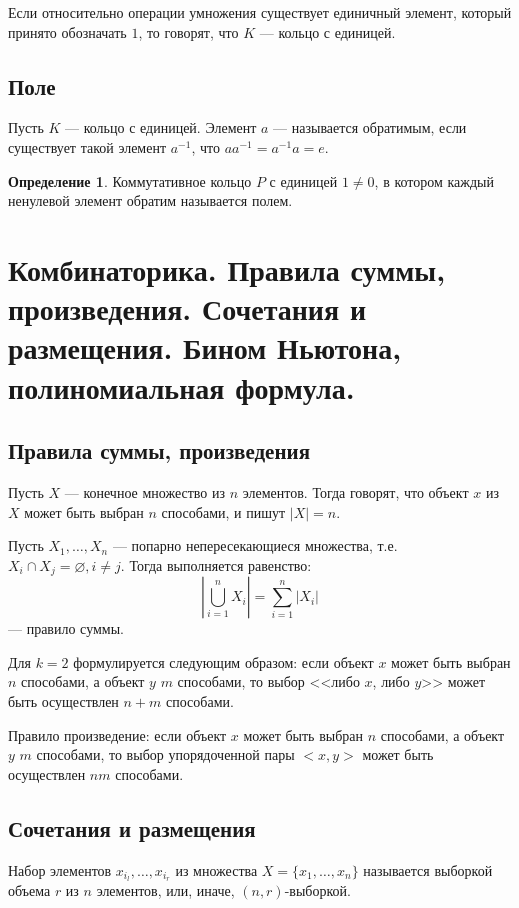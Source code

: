 \documentclass[12pt]{report}
\theoremstyle{definition}
\newtheorem{definition}[theorem]{Определение}
\begin{document}
Если относительно операции умножения существует единичный элемент,
который принято обозначать $1$, то говорят, что $K$ --- кольцо с единицей.

\subsection{Поле}
Пусть $K$ --- кольцо с единицей. Элемент $a$ --- называется обратимым, если
существует такой элемент $a^{-1}$, что $a a^{-1} = a^{-1} a = e$.

\begin{definition}
Коммутативное кольцо $P$ с единицей $1 \ne 0$, в котором каждый ненулевой
элемент обратим называется полем.
\end{definition}


\section
{
  Комбинаторика. Правила суммы, произведения. Сочетания и размещения.
  Бином Ньютона, полиномиальная формула.  
}

\subsection{Правила суммы, произведения}
Пусть $X$ --- конечное множество из $n$ элементов. Тогда говорят, что
объект $x$ из $X$ может быть выбран $n$ способами, и пишут $|X| = n$. 

Пусть $X_1, \dots, X_n$ --- попарно непересекающиеся множества, т.е.
$X_i \cap X_j = \varnothing, i \ne j$. Тогда выполняется равенство:
$$
|\bigcup_{i = 1}^n X_i| = \sum\limits_{i=1}^n |X_i|
$$ --- правило суммы.

Для $k=2$ формулируется следующим образом: если объект
$x$ может быть выбран $n$ способами, а объект $y$ $m$
способами, то выбор <<либо $x$, либо $y$>> может быть осуществлен
$n + m$ способами.

Правило произведение: если объект $x$ может быть выбран
$n$ способами, а объект $y$ $m$ способами, то выбор упорядоченной
пары $<x, y>$ может быть осуществлен $nm$ способами.

\subsection{Сочетания и размещения}
Набор элементов $x_{i_l}, \dots, x_{i_r}$ из множества
$X = \{x_1, \dots, x_n\}$ называется выборкой объема $r$ из
$n$ элементов, или, иначе, $(n, r)$-выборкой.
\end{document}
